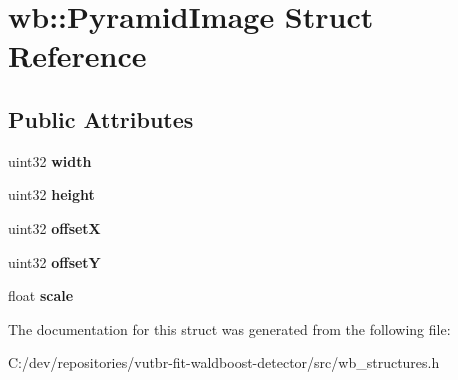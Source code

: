 \hypertarget{structwb_1_1_pyramid_image}{}\section{wb\+:\+:Pyramid\+Image Struct Reference}
\label{structwb_1_1_pyramid_image}
\subsection*{Public Attributes}
\begin{DoxyCompactItemize}
\item 
\hypertarget{structwb_1_1_pyramid_image_af0e05eff866b26606b4a08720a8811a2}{}uint32 {\bfseries width}\label{structwb_1_1_pyramid_image_af0e05eff866b26606b4a08720a8811a2}

\item 
\hypertarget{structwb_1_1_pyramid_image_a8803f11eb1a05cc1d5ee3e57a051b1b3}{}uint32 {\bfseries height}\label{structwb_1_1_pyramid_image_a8803f11eb1a05cc1d5ee3e57a051b1b3}

\item 
\hypertarget{structwb_1_1_pyramid_image_a5a4c86dab53bda06779daa9c6fa6728e}{}uint32 {\bfseries offset\+X}\label{structwb_1_1_pyramid_image_a5a4c86dab53bda06779daa9c6fa6728e}

\item 
\hypertarget{structwb_1_1_pyramid_image_a952bf6399f48810e45a9b5d683f2b97d}{}uint32 {\bfseries offset\+Y}\label{structwb_1_1_pyramid_image_a952bf6399f48810e45a9b5d683f2b97d}

\item 
\hypertarget{structwb_1_1_pyramid_image_a68f451c9b1e09372b8daf2cf2b2f304c}{}float {\bfseries scale}\label{structwb_1_1_pyramid_image_a68f451c9b1e09372b8daf2cf2b2f304c}

\end{DoxyCompactItemize}


The documentation for this struct was generated from the following file\+:\begin{DoxyCompactItemize}
\item 
C\+:/dev/repositories/vutbr-\/fit-\/waldboost-\/detector/src/wb\+\_\+structures.\+h\end{DoxyCompactItemize}
